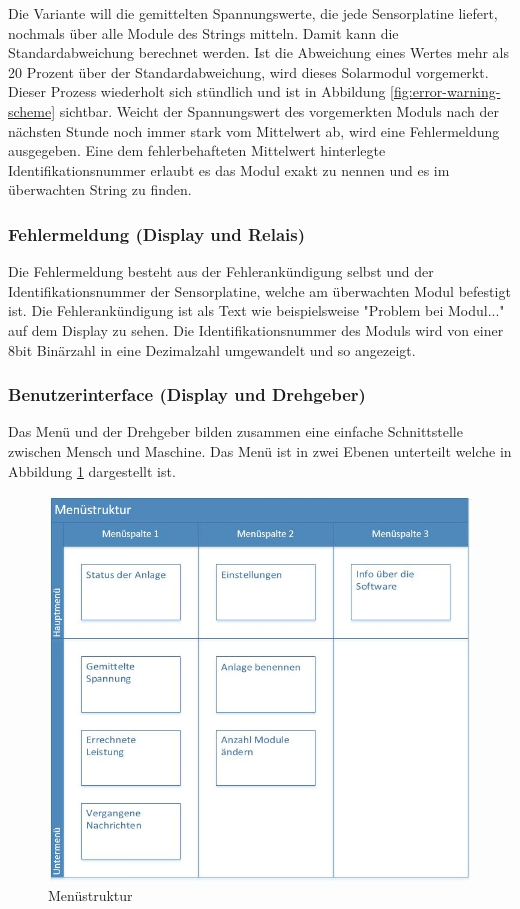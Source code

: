 Die Variante will die gemittelten Spannungswerte, die jede Sensorplatine liefert, nochmals über alle Module des Strings mitteln. Damit kann die Standardabweichung berechnet werden. Ist die Abweichung eines Wertes mehr als 20 Prozent über der Standardabweichung, wird dieses Solarmodul vorgemerkt. Dieser Prozess wiederholt sich stündlich und ist in Abbildung \ref{fig:error-warning-scheme} sichtbar. Weicht der Spannungswert des vorgemerkten Moduls nach der nächsten Stunde noch immer stark vom Mittelwert ab, wird eine Fehlermeldung ausgegeben. Eine dem fehlerbehafteten Mittelwert hinterlegte Identifikationsnummer erlaubt es das Modul exakt zu nennen und es im überwachten String zu finden.


\subsubsection{Fehlermeldung (Display und Relais)}
Die Fehlermeldung besteht aus der Fehlerankündigung selbst und der Identifikationsnummer der Sensorplatine, welche am überwachten Modul befestigt ist. Die Fehlerankündigung ist als Text wie beispielsweise "Problem bei Modul..." auf dem Display zu sehen. Die Identifikationsnummer des Moduls wird von einer 8bit Binärzahl in eine Dezimalzahl umgewandelt und so angezeigt.

\subsubsection{Benutzerinterface (Display und Drehgeber)}
Das Menü und der Drehgeber bilden zusammen eine einfache Schnittstelle zwischen Mensch und Maschine. Das Menü ist in zwei Ebenen unterteilt welche in Abbildung \ref{fig:structure-menu} dargestellt ist.

\begin{figure}[htbp] 
  \centering
     \includegraphics[width=1\textwidth]{graphics/structure-menu}
  \caption{Menüstruktur}
  \label{fig:structure-menu}
\end{figure}

